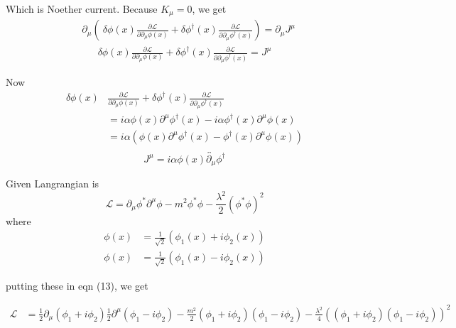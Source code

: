 \documentclass[12pt, letterpaper]{article}
\newcommand*{\1}{\hspace{1pt}}
\begin{document}
Which is Noether current. Because $K_{\mu} = 0$, we get
\begin{align}
    &\partial _{\mu} \left(\ \delta \phi (x) \frac{\partial \mathcal{L}}{\partial \partial _{\mu} \phi (x)} + \delta \phi ^{\dagger} (x) \frac{\partial \mathcal{L}}{\partial  \partial _{\mu} \phi ^{\dagger} (x)} \right) = \partial _{\mu} J^{\mu}
\end{align}
\begin{align}
     \delta \phi (x) \frac{\partial \mathcal{L}}{\partial \partial _{\mu} \phi (x)} + \delta \phi ^{\dagger} (x) \frac{\partial \mathcal{L}}{\partial \partial _{\mu} \phi ^{\dagger} (x)}  = J^{\mu}
\end{align}

Now
\begin{align*}
     \delta \phi (x) & \frac{\partial \mathcal{L}}{\partial \partial _{\mu}\phi (x)} + \delta \phi ^{\dagger} (x) \frac{\partial \mathcal{L}}{\partial \partial _{\mu} \phi ^{\dagger} (x)}  \\ 
    &= i \alpha \phi(x) \partial ^{\mu} \phi ^{\dagger} (x) - i \alpha \phi ^{\dagger} (x) \partial ^{\mu} \phi (x) \\ 
    &= i \alpha \left(\phi(x) \partial ^{\mu} \phi ^{\dagger} (x) - \phi ^{\dagger} (x) 
    \partial ^{\mu} \phi (x)  \right)\\
\end{align*}
\begin{equation}
   J ^{\mu} = i \alpha \phi (x) \overleftrightarrow{\partial _{\mu}} \phi ^{\dagger}
\end{equation}

Given Langrangian is
\begin{equation}
    \mathcal{L} = \partial _{\mu} \phi ^{*} \partial ^{\mu} \phi - m^{2} \phi ^{*} \phi - \frac{\lambda ^{2}}{2} (\phi ^{*} \phi) ^{2}
\end{equation}
where 
\begin{align}
    \phi (x) &= \frac{1}{\sqrt{2}} (\phi _{1} (x) + i\phi _{2} (x)) \\ 
    \phi (x) &= \frac{1}{\sqrt{2}} (\phi _{1} (x) - i\phi _{2} (x))
\end{align}

putting these in eqn (13), we get

\begin{align*}
    \mathcal{L} &= \frac{1}{2}\partial _{\mu} \left(\phi _{1} + i \phi _{2} \right)  \frac{1}{2}\partial ^{\mu} \left(\phi _{1} - i \phi _{2} \right) - \frac{m^{2}}{2} \left(\phi _{1} + i \phi _{2} \right)\left(\phi _{1} - i \phi _{2} \right) - \frac{\lambda ^{2}}{4} (\left(\phi _{1} + i \phi _{2} \right) \left(\phi _{1} - i \phi _{2} \right)) ^{2} 
\end{align*}
\end{document}
